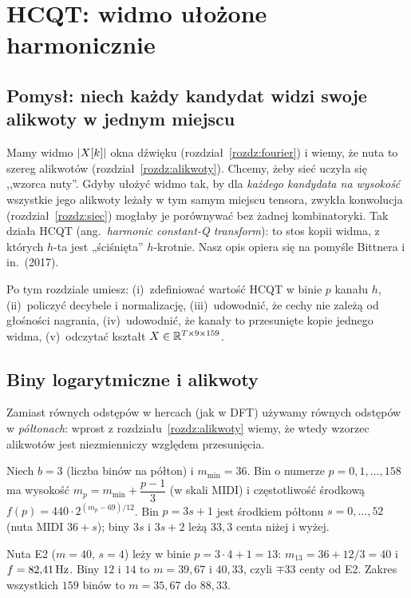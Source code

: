 \chapter{HCQT: widmo ułożone harmonicznie}\label{rozdz:hcqt}

\section{Pomysł: niech każdy kandydat widzi swoje alikwoty w jednym miejscu}

Mamy widmo $\left\lvert X[k]\right\rvert$ okna dźwięku (rozdział~\ref{rozdz:fourier}) i wiemy, że nuta to szereg alikwotów (rozdział~\ref{rozdz:alikwoty}).
Chcemy, żeby sieć uczyła się ,,wzorca nuty''. Gdyby ułożyć widmo tak, by dla \emph{każdego kandydata na wysokość} wszystkie jego
alikwoty leżały w tym samym miejscu tensora, zwykła konwolucja (rozdział~\ref{rozdz:siec}) mogłaby je porównywać bez żadnej
kombinatoryki. Tak działa HCQT (ang.\ \emph{harmonic constant-Q transform}): to stos kopii widma, z których $h$-ta jest „ściśnięta” $h$-krotnie.
Nasz opis opiera się na pomyśle Bittnera i in.\ (2017).

Po tym rozdziale umiesz: (i)~zdefiniować wartość HCQT w binie $p$ kanału $h$, (ii)~policzyć decybele i normalizację,
(iii)~udowodnić, że cechy nie zależą od głośności nagrania, (iv)~udowodnić, że kanały to przesunięte kopie jednego widma, (v)~odczytać kształt $X\in\mathbb{R}^{T\times9\times159}$.

\section{Biny logarytmiczne i alikwoty}

Zamiast równych odstępów w hercach (jak w DFT) używamy równych odstępów w \emph{półtonach}: wprost z rozdziału~\ref{rozdz:alikwoty} wiemy, że wtedy
wzorzec alikwotów jest niezmienniczy względem przesunięcia.

\begin{definicja}\label{def:bin}
Niech $b=3$ (liczba binów na półton) i $m_{\min}=36$. Bin o numerze $p=0,1,\dots,158$ ma wysokość
$m_p=m_{\min}+\dfrac{p-1}{3}$ (w skali MIDI) i częstotliwość środkową $f(p)=440\cdot2^{(m_p-69)/12}$. Bin $p=3s+1$ jest środkiem półtonu $s=0,\dots,52$ (nuta MIDI $36+s$);
biny $3s$ i $3s+2$ leżą $33{,}3$ centa niżej i wyżej.
\end{definicja}

\begin{przyklad}\label{prz:bin}
Nuta E2 ($m=40$, $s=4$) leży w binie $p=3\cdot4+1=13$: $m_{13}=36+12/3=40$ i $f=82{,}41\,\mathrm{Hz}$. Biny $12$ i $14$ to $m=39{,}67$ i $40{,}33$, czyli $\mp33$ centy od E2.
Zakres wszystkich $159$ binów to $m=35{,}67$ do $88{,}33$.
\end{przyklad}

